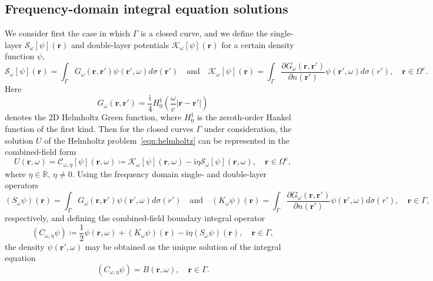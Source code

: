 \documentclass[11pt]{article}
\theoremstyle{plain}
\theoremstyle{remark}
\def \br{\mathbf{r}}
\begin{document}
\subsection{Frequency-domain integral equation solutions}\label{sec:inteqs}
We consider first the case in which $\Gamma$ is a closed curve, and we
define the single-layer $\mathcal{S}_\omega[\psi](\br)$ and
double-layer potentials $\mathcal{K}_\omega[\psi](\br)$ for a certain
density function $\psi$,
\begin{equation}
    \mathcal{S}_\omega[\psi](\br) = \int_\Gamma G_\omega(\br,\br')\psi(\br',\omega)d\sigma(\br') \quad \text{and} \quad \mathcal{K}_\omega[\psi](\br)=\int_{\Gamma}\frac{\partial G_\omega(\br,\br')}{\partial n(\br')}\psi(\br',\omega)d\sigma(r'), \quad \br \in \Omega^e.
\end{equation}
Here
\begin{equation}\label{eqn:green}
    G_\omega(\br,\br') = \frac{\mathrm{i}}{4}H_0^1\left(\frac{\omega}{c}|\br - \br'| \right)
\end{equation}
denotes the 2D Helmholtz Green function, where $H_0^1$ is the
zeroth-order Hankel function of the first kind.  Then for the closed
curves $\Gamma$ under consideration, the solution $U$ of the Helmholtz
problem~\eqref{eqn:helmholtz} can be represented in the combined-field
form
\begin{equation}\label{eqn:combined_rep}
  U(\br,\omega) = \mathcal{C}_{\omega,\eta}[\psi](\br,\omega) \coloneqq \mathcal{K}_\omega[\psi](\br,\omega) - \mathrm{i}\eta \mathcal{S}_\omega[\psi](\br,\omega), \quad \br \in \Omega^{\mathrm{e}},  
\end{equation}
where $\eta\in\mathbb{R}$, $\eta \ne 0$. Using the frequency domain single-
and double-layer operators
 \begin{equation}\label{eqn:sl_dl_operator}
    (S_\omega\psi)(\br) = \int_\Gamma G_\omega(\br,\br')\psi(\br',\omega)d\sigma(r') \quad \text{and} \quad (K_\omega \psi)(\br) = \int_{\Gamma}\frac{\partial G_\omega(\br,\br')}{\partial n(\br')}\psi(\br',\omega)d\sigma(r'), \quad \br \in \Gamma,
\end{equation}
respectively, and defining the combined-field boundary integral operator
\begin{equation}\label{eqn:combined_op}
     (C_{\omega,\eta} \psi) \coloneqq \frac{1}{2} \psi(\br,\omega) + (K_\omega \psi)(\br) - \mathrm{i}\eta(S_\omega \psi)(\br), \quad \br \in \Gamma,
 \end{equation}
the density $\psi(\br',\omega)$ may be obtained as the
unique solution of the integral equation
\begin{equation}\label{eqn:combined_bie}
   (C_{\omega,\eta} \psi) = B(\br,\omega), \quad \br \in \Gamma.
\end{equation}
\end{document}
